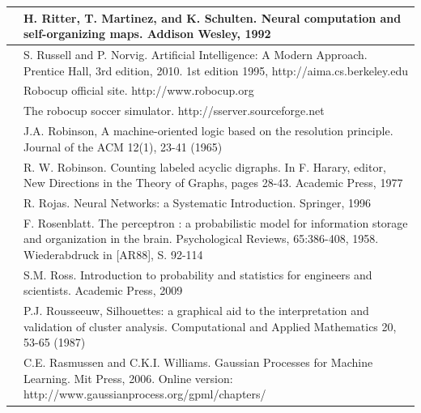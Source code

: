 \documentclass[10pt]{book}
\begin{document}
\begin{tabular}{|l|l|}
\hline [RMS92] & H. Ritter, T. Martinez, and K. Schulten. Neural computation and self-organizing maps. Addison Wesley, 1992 \\
\hline [RN10] & S. Russell and P. Norvig. Artificial Intelligence: A Modern Approach. Prentice Hall, 3rd edition, 2010. 1st edition 1995, http://aima.cs.berkeley.edu \\
\hline [Roba] & Robocup official site. http://www.robocup.org \\
\hline [Robb] & The robocup soccer simulator. http://sserver.sourceforge.net \\
\hline [Rob65] & J.A. Robinson, A machine-oriented logic based on the resolution principle. Journal of the ACM 12(1), 23-41 (1965) \\
\hline [\cite{robinson1977dags}] & R. W. Robinson. Counting labeled acyclic digraphs. In F. Harary, editor, New Directions in the Theory of Graphs, pages 28-43. Academic Press, 1977 \\
\hline [Roj96] & R. Rojas. Neural Networks: a Systematic Introduction. Springer, 1996 \\
\hline [Ros58] & F. Rosenblatt. The perceptron : a probabilistic model for information storage and organization in the brain. Psychological Reviews, 65:386-408, 1958. Wiederabdruck in [AR88], S. 92-114 \\
\hline [Ros09] & S.M. Ross. Introduction to probability and statistics for engineers and scientists. Academic Press, 2009 \\
\hline [Rou87] & P.J. Rousseeuw, Silhouettes: a graphical aid to the interpretation and validation of cluster analysis. Computational and Applied Mathematics 20, 53-65 (1987) \\
\hline [RW06] & C.E. Rasmussen and C.K.I. Williams. Gaussian Processes for Machine Learning. Mit Press, 2006. Online version: http://www.gaussianprocess.org/gpml/chapters/ \\
\hline
\end{tabular}
\end{document}
